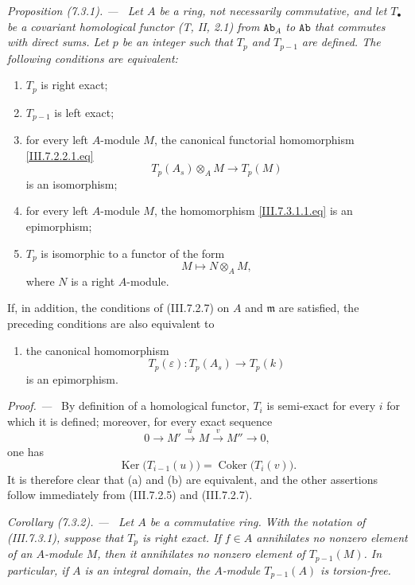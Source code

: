 \documentclass[10pt,oneside]{book}
\newcommand{\cat}[1]{\mathtt{#1}}
\newcommand{\Ker}{\operatorname{Ker}}
\newcommand{\Coker}{\operatorname{Coker}}
\newcommand{\sref}[2][]{(#2)}
\newcommand{\oldpage}[2][]{\setcounter{footnote}{0}\marginpar{\scriptsize\textbf{#1}~|~#2}\ignorespaces}
\newenvironment{proposition}[1][]{\par\medskip\noindent\itshape Proposition (#1). ---\ }{\par}
\newenvironment{corollary}[1][]{\par\medskip\noindent\itshape Corollary (#1). ---\ }{\par}
\newenvironment{proof}{\par\medskip\noindent\textit{Proof. ---\ }}{\par}
\begin{document}
\begin{proposition}[7.3.1]
\label{III.7.3.1}
Let $A$ be a ring, not necessarily commutative, and let
$T_\bullet$ be a covariant homological functor
\emph{(T, II, 2.1)} from $\cat{Ab}_A$ to $\cat{Ab}$ that
commutes with direct sums.  Let $p$ be an integer such that
$T_p$ and $T_{p-1}$ are defined.  The following conditions are
equivalent:
\begin{enumerate}
  \item[(a)] $T_p$ is right exact;
  \item[(b)] $T_{p-1}$ is left exact;

\oldpage[III]{181}

  \item[(c)] for every left $A$-module $M$, the canonical
    functorial homomorphism \eqref{III.7.2.2.1.eq}
    \[
      T_p(A_s)\otimes_A M
      \longrightarrow
      T_p(M)
      \tag{7.3.1.1}\label{III.7.3.1.1.eq}
    \]
    is an isomorphism;
  \item[(d)] for every left $A$-module $M$, the homomorphism
    \eqref{III.7.3.1.1.eq} is an epimorphism;
  \item[(e)] $T_p$ is isomorphic to a functor of the form
    \[
      M\longmapsto N\otimes_A M,
    \]
    where $N$ is a right $A$-module.
\end{enumerate}
If, in addition, the conditions of \sref{III.7.2.7} on $A$ and
$\mathfrak m$ are satisfied, the preceding conditions are also
equivalent to
\begin{enumerate}
  \item[(f)] the canonical homomorphism
    \[
      T_p(\varepsilon):T_p(A_s)\longrightarrow T_p(k)
    \]
    is an epimorphism.
\end{enumerate}
\end{proposition}

\begin{proof}
By definition of a homological functor, $T_i$ is semi-exact for
every $i$ for which it is defined; moreover, for every exact
sequence
\[
  0\longrightarrow M'
  \xrightarrow{u}M
  \xrightarrow{v}M''
  \longrightarrow0,
\]
one has
\[
  \Ker\bigl(T_{i-1}(u)\bigr)
  =
  \Coker\bigl(T_i(v)\bigr).
\]
It is therefore clear that (a) and (b) are equivalent, and the
other assertions follow immediately from \sref{III.7.2.5} and
\sref{III.7.2.7}.
\end{proof}

\begin{corollary}[7.3.2]
\label{III.7.3.2}
Let $A$ be a commutative ring.  With the notation of
\sref{III.7.3.1}, suppose that $T_p$ is right exact.  If
$f\in A$ annihilates no nonzero element of an $A$-module $M$,
then it annihilates no nonzero element of $T_{p-1}(M)$.  In
particular, if $A$ is an integral domain, the $A$-module
$T_{p-1}(A)$ is torsion-free.
\end{corollary}
\end{document}
